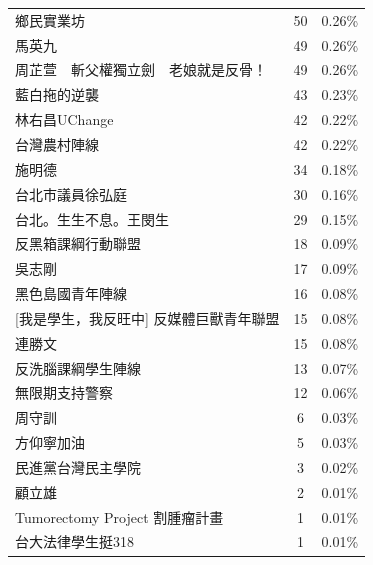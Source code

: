 \documentclass[letterpaper, 10pt, conference]{ieeeconf}   %
\begin{document}
\begin{CJK}{UTF8}{bsmi}
\begin{longtable}[c]{@{}lcc@{}}
鄉民實業坊 & 50 & 0.26\% \\
馬英九 & 49 & 0.26\% \\
周芷萱　斬父權獨立劍　老娘就是反骨！ & 49 & 0.26\% \\
藍白拖的逆襲 & 43 & 0.23\% \\
林右昌UChange & 42 & 0.22\% \\
台灣農村陣線 & 42 & 0.22\% \\
施明德 & 34 & 0.18\% \\
台北市議員徐弘庭 & 30 & 0.16\% \\
台北。生生不息。王閔生 & 29 & 0.15\% \\
反黑箱課綱行動聯盟 & 18 & 0.09\% \\
吳志剛 & 17 & 0.09\% \\
黑色島國青年陣線 & 16 & 0.08\% \\
{[}我是學生，我反旺中{]} 反媒體巨獸青年聯盟 & 15 & 0.08\% \\
連勝文 & 15 & 0.08\% \\
反洗腦課綱學生陣線 & 13 & 0.07\% \\
無限期支持警察 & 12 & 0.06\% \\
周守訓 & 6 & 0.03\% \\
方仰寧加油 & 5 & 0.03\% \\
民進黨台灣民主學院 & 3 & 0.02\% \\
顧立雄 & 2 & 0.01\% \\
Tumorectomy Project 割腫瘤計畫 & 1 & 0.01\% \\
台大法律學生挺318 & 1 & 0.01\% \\* \bottomrule
\end{longtable}


\end{CJK}
\end{document}
